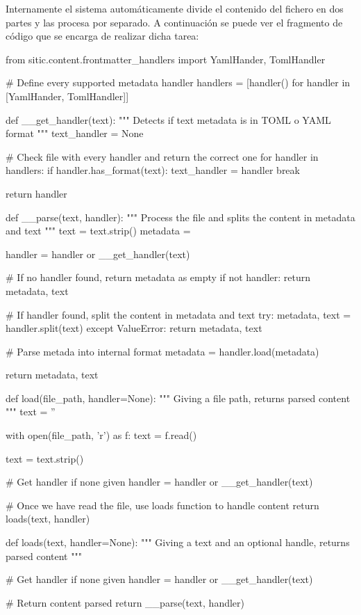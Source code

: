 Internamente el sistema automáticamente divide el contenido del fichero en dos partes y las procesa por separado.
A continuación se puede ver el fragmento de código que se encarga de realizar dicha tarea:

\begin{pythoncode}
    from sitic.content.frontmatter_handlers import YamlHander, TomlHandler

    # Define every supported metadata handler
    handlers = [handler() for handler in [YamlHander, TomlHandler]]

    def __get_handler(text):
        """ Detects if text metadata is in TOML o YAML format """
        text_handler = None

        # Check file with every handler and return the correct one
        for handler in handlers:
            if handler.has_format(text):
                text_handler = handler
                break

        return handler


    def __parse(text, handler):
        """ Process the file and splits the content in metadata and text """
        text = text.strip()
        metadata = {}

        handler = handler or __get_handler(text)

        # If no handler found, return metadata as empty
        if not handler:
            return metadata, text

        # If handler found, split the content in metadata and text
        try:
            metadata, text = handler.split(text)
        except ValueError:
            return metadata, text

        # Parse metada into internal format
        metadata = handler.load(metadata)

        return metadata, text


    def load(file_path, handler=None):
        """ Giving a file path, returns parsed content """
        text = ''

        with open(file_path, 'r') as f:
            text = f.read()

        text = text.strip()

        # Get handler if none given
        handler = handler or __get_handler(text)

        # Once we have read the file, use loads function to handle content
        return loads(text, handler)


    def loads(text, handler=None):
        """ Giving a text and an optional handle, returns parsed content """

        # Get handler if none given
        handler = handler or __get_handler(text)

        # Return content parsed
        return __parse(text, handler)
\end{pythoncode}


